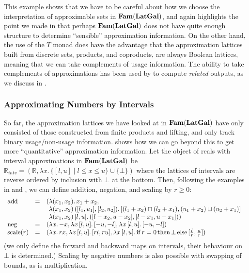 This example shows that we have to be careful about how we choose the
interpretation of approximable sets in $\mathbf{Fam}(\mathbf{LatGal})$, and again
highlights the point we made in  that
perhaps $\mathbf{Fam}(\mathbf{LatGal})$ does not have quite enough structure to
determine ``sensible'' approximation information. On the other hand,
the use of the $T$ monad does have the advantage that the
approximation lattices built from discrete sets, products, and
coproducts, are always Boolean lattices, meaning that we can take
complements of usage information. The ability to take complements of
approximations has been used by \citet{perera22} to compute
\emph{related} outputs, as we discuss in
.

\subsubsection{Approximating Numbers by Intervals}
\label{sec:interval-approx}

So far, the approximation lattices we have looked at in
$\mathbf{Fam}(\mathbf{LatGal})$ have only consisted of those constructed from finite
products and lifting, and only track binary usage/non-usage
information.  shows how we can go
beyond this to get more ``quantitative'' approximation
information. Let the object of reals with interval approximations in
$\mathbf{Fam}(\mathbf{LatGal})$ be
$\mathbb{R}_{\mathit{intv}} = (\mathbb{R}, \lambda x.\,\{[l,u] \mid l
\leq x \leq u\} \cup \{\bot\})$ where the lattices of intervals are
reverse ordered by inclusion with $\bot$ at the bottom. Then,
following the examples in  and
, we can define addition, negation, and
scaling by $r \geq 0$:
\begin{displaymath}
  \begin{array}{lcl}
    \mathrm{add}&=&(\begin{array}[t]{@{}l}
      \lambda (x_1,x_2).\,x_1+x_2, \\
      \lambda (x_1,x_2)\,([l_1,u_1],[l_2,u_2]).\,[(l_1+x_2) \sqcap (l_2+x_1),(u_1+x_2) \sqcup (u_2+x_1)] \\
      \lambda (x_1,x_2)\,[l,u].\,([l-x_2,u-x_2],[l-x_1,u-x_1]))
    \end{array}\\
    \mathrm{neg}&=&(\lambda x.\,{-}x, \lambda x\,[l,u].\,[-u,-l], \lambda x\,[l,u].\,[-u,-l]) \\
    \mathrm{scale}(r)&=&(\lambda x.\,rx, \lambda x\,[l,u].\,[rl,ru], \lambda x\,[l,u].\,\mathrm{if}\,r=0\,\mathrm{then}\,\bot\,\mathrm{else}\,[\frac{l}{r},\frac{u}{r}])
  \end{array}
\end{displaymath}
(we only define the forward and backward maps on intervals, their
behaviour on $\bot$ is determined.)  Scaling by negative numbers is
also possible with swapping of bounds, as is multiplication.

